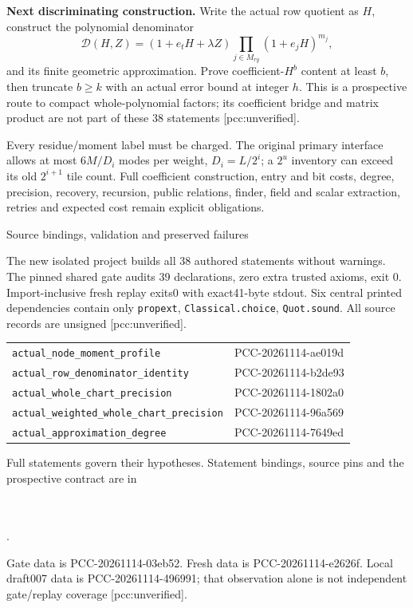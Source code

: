 \documentclass[10pt]{article}
\begin{document}
\textbf{Next discriminating construction.} Write the actual row quotient as
$H$, construct the polynomial denominator
\[
 \mathcal D(H,Z)=(1+e_tH+\lambda Z)
       \prod_{j\in M_{ry}}(1+e_jH)^{m_j},
\]
and its finite geometric approximation. Prove coefficient-$H^b$ content
at least $b$, then truncate $b\ge k$ with an actual error bound at integer
$h$. This is a prospective route to compact whole-polynomial factors; its
coefficient bridge and matrix product are not part of these 38 statements
[pcc:unverified].

Every residue/moment label must be charged. The original primary interface
allows at most $6M/D_i$ modes per weight, $D_i=L/2^i$; a $2^u$ inventory
can exceed its old $2^{i+1}$ tile count. Full coefficient construction,
entry and bit costs, degree, precision, recovery, recursion, public relations,
finder, field and scalar extraction, retries and expected cost remain
explicit obligations.

\newpage
\begin{center}{\Large Source bindings, validation and preserved failures}\end{center}
The new isolated project builds all 38 authored statements without warnings.
The pinned shared gate audits 39 declarations, zero extra trusted axioms,
exit 0. Import-inclusive fresh replay exits0 with exact41-byte stdout. Six central printed dependencies
contain only \texttt{propext}, \texttt{Classical.choice}, \texttt{Quot.sound}.
All source records are unsigned [pcc:unverified].

\begin{center}\small
\begin{tabular}{p{.64\linewidth}p{.25\linewidth}}
\texttt{actual\_node\_moment\_profile}&PCC-20261114-ae019d\\
\texttt{actual\_row\_denominator\_identity}&PCC-20261114-b2de93\\
\texttt{actual\_whole\_chart\_precision}&PCC-20261114-1802a0\\
\texttt{actual\_weighted\_whole\_chart\_precision}&PCC-20261114-96a569\\
\texttt{actual\_approximation\_degree}&PCC-20261114-7649ed
\end{tabular}
\end{center}
Full statements govern their hypotheses. Statement bindings, source pins
and the prospective contract are in
\begin{center}\small
{}\\
\\
.
\end{center}
Gate data is PCC-20261114-03eb52. Fresh data is PCC-20261114-e2626f.
Local draft007 data is PCC-20261114-496991;
that observation alone is not independent gate/replay coverage
[pcc:unverified].
\end{document}
